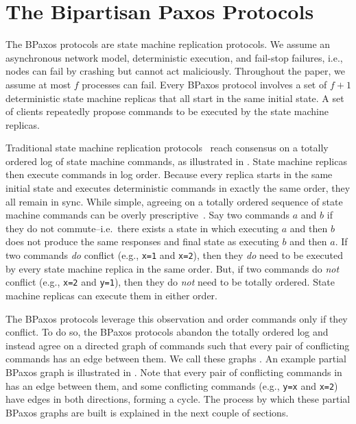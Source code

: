 \section{The Bipartisan Paxos Protocols}
The BPaxos protocols are state machine replication protocols. We assume an
asynchronous network model, deterministic execution, and fail-stop failures,
i.e., nodes can fail by crashing but cannot act maliciously. Throughout the
paper, we assume at most $f$ processes can fail. Every BPaxos protocol involves
a set of $f + 1$ deterministic state machine replicas that all start in the
same initial state. A set of clients repeatedly propose commands to be executed
by the state machine replicas.



Traditional state machine replication protocols~\cite{liskov2012viewstamped,
lamport1998part} reach consensus on a totally ordered log of state machine
commands, as illustrated in . State machine replicas then
execute commands in log order. Because every replica starts in the same initial
state and executes deterministic commands in exactly the same order,
they all remain in sync.
%
While simple, agreeing on a totally ordered sequence of state machine commands
can be overly prescriptive~\cite{lamport2005generalized, moraru2013there}. Say
two commands $a$ and $b$  if they do not commute--i.e.\ there
exists a state in which executing $a$ and then $b$ does not produce the same
responses and final state as executing $b$ and then $a$. If two commands
\emph{do} conflict (e.g., \texttt{x=1} and \texttt{x=2}), then they \emph{do}
need to be executed by every state machine replica in the same order.  But, if
two commands do \emph{not} conflict (e.g., \texttt{x=2} and \texttt{y=1}), then
they do \emph{not} need to be totally ordered. State machine replicas can
execute them in either order.

The BPaxos protocols leverage this observation and order commands only if they
conflict. To do so, the BPaxos protocols abandon the totally ordered log and
instead agree on a directed graph of commands such that every pair of
conflicting commands has an edge between them. We call these graphs
. An example partial BPaxos graph is illustrated
in . Note that every pair of conflicting commands in
 has an edge between them, and some conflicting commands
(e.g., \texttt{y=x} and \texttt{x=2}) have edges in both directions, forming a
cycle. The process by which these partial BPaxos graphs are built is explained
in the next couple of sections.

